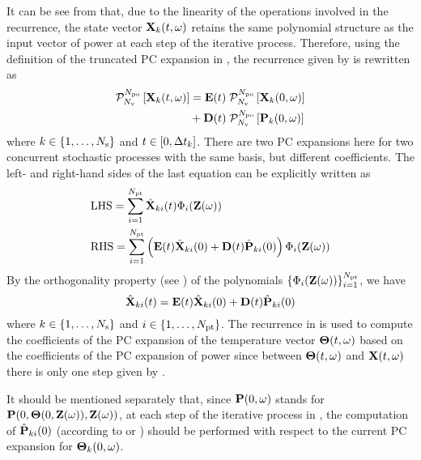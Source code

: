 It can be see from  that, due to the linearity of the operations involved in the recurrence, the state vector $\mathbf{X}_k(t, \omega)$ retains the same polynomial structure as the input vector of power at each step of the iterative process. Therefore, using the definition of the truncated PC expansion in , the recurrence given by  is rewritten as
\begin{align*}
  \oPC{\vars}{\pcorder}{\vX_k(\t, \o)} & = \mE(\t) \; \oPC{\vars}{\pcorder}{\vX_k(0, \o)} \\
  & {} + \mD(\t) \; \oPC{\vars}{\pcorder}{\vP_k(0, \o)}
\end{align*}
where $k \in \{ 1, \dotsc, N_\text{s} \}$ and $t \in [0, \Delta t_k]$. There are two PC expansions here for two concurrent stochastic processes with the same basis, but different coefficients. The left- and right-hand sides of the last equation can be explicitly written as
\begin{align*}
  & \text{LHS} = \sum_{i = 1}^{\pcterms} \pcc{\vX}_{ki}(\t) \pcb_i(\vZ(\o)) \\
  & \text{RHS} = \sum_{i = 1}^{\pcterms} \left( \mE(\t) \pcc{\vX}_{ki}(0) + \mD(\t) \pcc{\vP}_{ki}(0) \right) \pcb_i(\vZ(\o))
\end{align*}
By the orthogonality property (see ) of the polynomials $\{ \Phi_i(\mathbf{Z}(\omega)) \}_{i = 1}^{{N_\text{pt}}}$, we have
\begin{equation} \elabel{pc-recurrence}
  \pcc{\vX}_{ki}(\t) = \mE(\t) \pcc{\vX}_{ki}(0) + \mD(\t) \pcc{\vP}_{ki}(0)
\end{equation}
where $k \in \{ 1, \dots, N_\text{s} \}$ and $i \in \{ 1, \dotsc, {N_\text{pt}} \}$. The recurrence in  is used to compute the coefficients of the PC expansion of the temperature vector ${\boldsymbol\Theta}(t, \omega)$ based on the coefficients of the PC expansion of power since between ${\boldsymbol\Theta}(t, \omega)$ and $\mathbf{X}(t, \omega)$ there is only one step given by .

It should be mentioned separately that, since $\mathbf{P}(0, \omega)$ stands for $\mathbf{P}(0, {\boldsymbol\Theta}(0, \mathbf{Z}(\omega)), \mathbf{Z}(\omega))$, at each step of the iterative process in , the computation of $\hat{\mathbf{P}}_{ki}(0)$ (according to  or ) should be performed with respect to the current PC expansion for ${\boldsymbol\Theta}_k(0, \omega)$.
